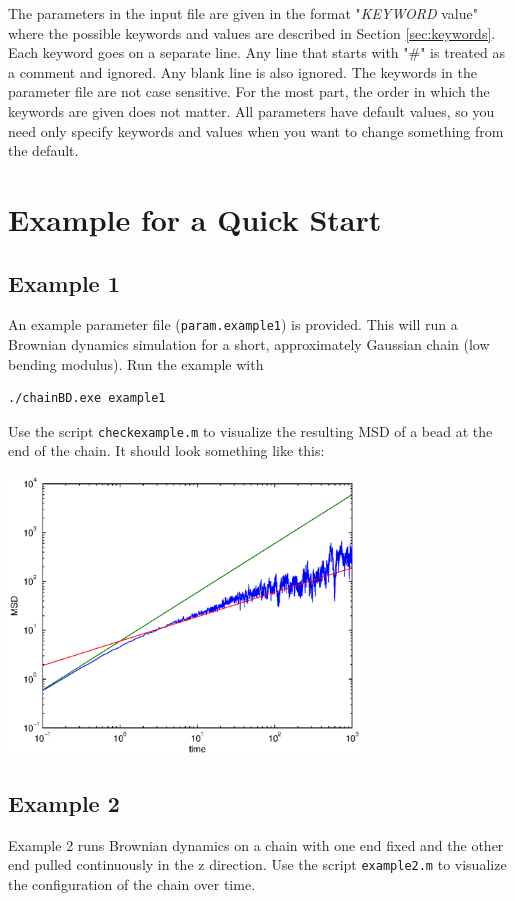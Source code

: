 \documentclass[12pt]{article}
\begin{document}
The parameters in the input file are given in the format "{\em KEYWORD} value" where the possible keywords and values are described
in Section \ref{sec:keywords}. Each keyword goes on a separate
line. Any line that starts with "\#" is treated as a comment and
ignored. Any blank line is also ignored. The keywords in the parameter
file are not case sensitive. For the most part, the order in which the
keywords are given does not matter. All parameters have default
values, so you need only specify keywords and values when you want to
change something from the default.


\section{Example for a Quick Start}
\subsection{Example 1}
An example parameter file (\verb=param.example1=) is provided. This will run a Brownian dynamics simulation for a short, approximately Gaussian chain (low bending modulus). Run the example with 
\begin{verbatim}
./chainBD.exe example1
\end{verbatim}

Use the script \verb=checkexample.m= to visualize the resulting MSD of a bead at the end of the chain. It should look something like this:

\centerline{\includegraphics[width=0.7\textwidth]{example_MSD.eps}}

\subsection{Example 2}
Example 2 runs Brownian dynamics on a chain with one end fixed and the other end pulled continuously in the z direction. Use the script \verb=example2.m= to visualize the configuration of the chain over time.
\end{document}
